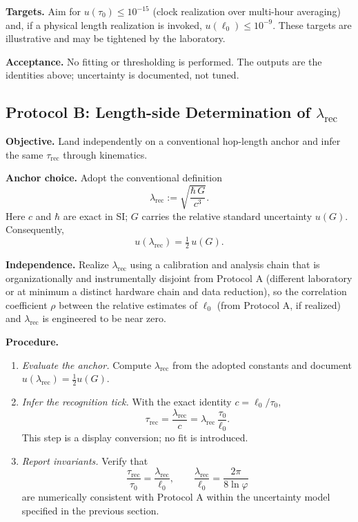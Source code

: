 \documentclass[11pt]{article}
\begin{document}
\textbf{Targets.} Aim for \(u(\tau_{0})\le 10^{-15}\) (clock realization over multi-hour averaging) and, if a physical length realization is invoked, \(u(\ell_{0})\le 10^{-9}\). These targets are illustrative and may be tightened by the laboratory.

\textbf{Acceptance.} No fitting or thresholding is performed. The outputs are the identities above; uncertainty is documented, not tuned.

\medskip

\subsection*{Protocol B: Length-side Determination of \(\lambda_{\mathrm{rec}}\)}
\textbf{Objective.} Land independently on a conventional hop-length anchor and infer the same \(\tau_{\mathrm{rec}}\) through kinematics.

\textbf{Anchor choice.} Adopt the conventional definition
\[
\lambda_{\mathrm{rec}}:=\sqrt{\frac{\hbar\,G}{c^{3}}}.
\]
Here \(c\) and \(\hbar\) are exact in SI; \(G\) carries the relative standard uncertainty \(u(G)\). Consequently,
\[
u(\lambda_{\mathrm{rec}})=\tfrac12\,u(G).
\]

\textbf{Independence.} Realize \(\lambda_{\mathrm{rec}}\) using a calibration and analysis chain that is organizationally and instrumentally disjoint from Protocol A (different laboratory or at minimum a distinct hardware chain and data reduction), so the correlation coefficient \(\rho\) between the relative estimates of \(\ell_{0}\) (from Protocol A, if realized) and \(\lambda_{\mathrm{rec}}\) is engineered to be near zero.

\textbf{Procedure.}
\begin{enumerate}
  \item \emph{Evaluate the anchor.} Compute \(\lambda_{\mathrm{rec}}\) from the adopted constants and document \(u(\lambda_{\mathrm{rec}})=\tfrac12 u(G)\).
  \item \emph{Infer the recognition tick.} With the exact identity \(c=\ell_{0}/\tau_{0}\),
  \[
  \tau_{\mathrm{rec}}=\frac{\lambda_{\mathrm{rec}}}{c}=\lambda_{\mathrm{rec}}\ \frac{\tau_{0}}{\ell_{0}}.
  \]
  This step is a display conversion; no fit is introduced.
  \item \emph{Report invariants.} Verify that
  \[
  \frac{\tau_{\mathrm{rec}}}{\tau_{0}}=\frac{\lambda_{\mathrm{rec}}}{\ell_{0}},\qquad
  \frac{\lambda_{\mathrm{rec}}}{\ell_{0}}=\frac{2\pi}{8\ln\varphi}
  \]
  are numerically consistent with Protocol A within the uncertainty model specified in the previous section.
\end{enumerate}
\end{document}
